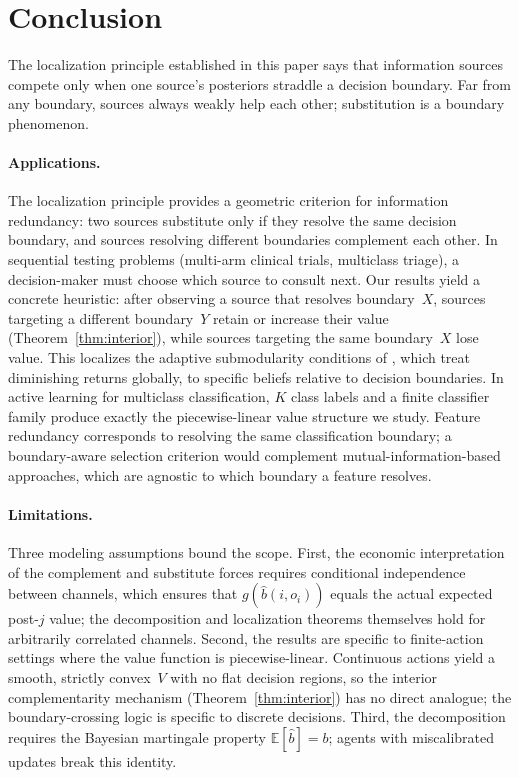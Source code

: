 \documentclass{article}
\newcommand{\bpost}{\hat{b}}
\newcommand{\E}{\mathbb{E}}
\begin{document}
\section{Conclusion}
\label{sec:discussion}

The localization principle established in this paper says that information sources compete only when one source's posteriors straddle a decision boundary.
Far from any boundary, sources always weakly help each other; substitution is a boundary phenomenon.

\paragraph{Applications.}
The localization principle provides a geometric criterion for information redundancy: two sources substitute only if they resolve the same decision boundary, and sources resolving different boundaries complement each other.
In sequential testing problems (multi-arm clinical trials, multiclass triage), a decision-maker must choose which source to consult next.
Our results yield a concrete heuristic: after observing a source that resolves boundary~$X$, sources targeting a different boundary~$Y$ retain or increase their value (Theorem~\ref{thm:interior}), while sources targeting the same boundary~$X$ lose value.
This localizes the adaptive submodularity conditions of \citet{GolovinKrause2011}, which treat diminishing returns globally, to specific beliefs relative to decision boundaries.
In active learning for multiclass classification, $K$ class labels and a finite classifier family produce exactly the piecewise-linear value structure we study.
Feature redundancy corresponds to resolving the same classification boundary; a boundary-aware selection criterion would complement mutual-information-based approaches, which are agnostic to which boundary a feature resolves.

\paragraph{Limitations.}
Three modeling assumptions bound the scope.
First, the economic interpretation of the complement and substitute forces requires conditional independence between channels, which ensures that $g(\bpost(i, o_i))$ equals the actual expected post-$j$ value; the decomposition and localization theorems themselves hold for arbitrarily correlated channels.
Second, the results are specific to finite-action settings where the value function is piecewise-linear.
Continuous actions yield a smooth, strictly convex~$V$ with no flat decision regions, so the interior complementarity mechanism (Theorem~\ref{thm:interior}) has no direct analogue; the boundary-crossing logic is specific to discrete decisions.
Third, the decomposition requires the Bayesian martingale property $\E[\bpost] = b$; agents with miscalibrated updates break this identity.
\end{document}
